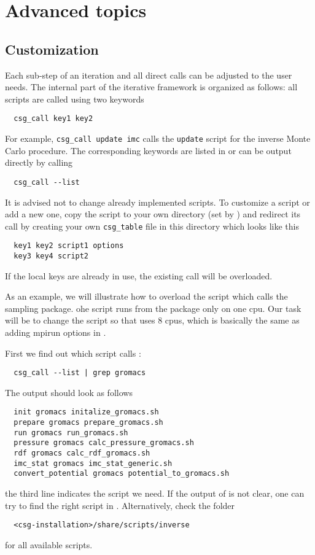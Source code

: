 \chapter{Advanced topics}
\label{sec:advanced_topics}

\section{Customization}
Each sub-step of an iteration and all direct calls can be adjusted to the user needs. The internal part of the iterative framework is organized as follows: all scripts are called using two keywords
\begin{verbatim}
  csg_call key1 key2
\end{verbatim}
For example, \texttt{csg\_call update imc} calls the \texttt{update} script for the inverse Monte Carlo procedure. The corresponding keywords are listed in  or can be output directly by calling
\begin{verbatim}
  csg_call --list
\end{verbatim}

It is advised not to change already implemented scripts. To customize a script or add a new one, copy the script to your own directory (set by ) and redirect its call by creating your own \texttt{csg\_table} file in this directory which looks like this
\begin{verbatim}
  key1 key2 script1 options
  key3 key4 script2
\end{verbatim}
If the local keys are already in use, the existing call will be overloaded.

As an example, we will illustrate how to overload the script which calls the sampling package. 
ohe  script runs  from the \gromacs package only on one cpu. Our task will be to change the script so that \gromacs uses 8 cpus, which is basically the same as adding mpirun options in .

First we find out which script calls :
\begin{verbatim}
  csg_call --list | grep gromacs
\end{verbatim}
The output should look as follows
\begin{verbatim}
  init gromacs initalize_gromacs.sh
  prepare gromacs prepare_gromacs.sh
  run gromacs run_gromacs.sh
  pressure gromacs calc_pressure_gromacs.sh
  rdf gromacs calc_rdf_gromacs.sh
  imc_stat gromacs imc_stat_generic.sh
  convert_potential gromacs potential_to_gromacs.sh
\end{verbatim}
the third line indicates the script we need. If the output of  is not clear, one can try to find the right script in . Alternatively, check the folder
\begin{verbatim}
  <csg-installation>/share/scripts/inverse
\end{verbatim}
for all available scripts. 

